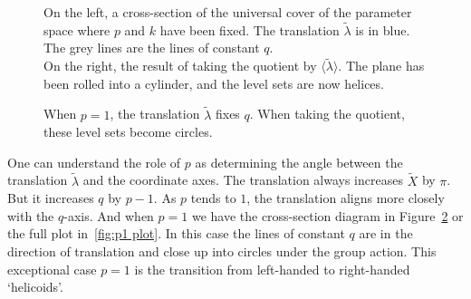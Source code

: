 \documentclass{article}
\begin{document}
\begin{figure}
\begin{tikzpicture}
        \end{tikzpicture}
    \caption{On the left, a cross-section of the universal cover of the parameter space where $p$ and $k$ have been fixed. The translation $\tilde{\lambda}$ is in blue. The grey lines are the lines of constant $q$.\\
    On the right, the result of taking the quotient by $\langle \tilde{\lambda}\rangle$. The plane has been rolled into a cylinder, and the level sets are now helices.\label{fig:level set quotient}}
\end{figure}
\begin{figure}
    
    \caption{When $p=1$, the translation $\tilde{\lambda}$ fixes $q$. When taking the quotient, these level sets become circles.\label{fig:level set quotient p1}}
\end{figure}

One can understand the role of $p$ as determining the angle between the translation $\tilde{\lambda}$ and the coordinate axes. The translation always increases $\tilde{X}$ by $\pi$. But it increases $q$ by $p-1$. As $p$ tends to $1$, the translation aligns more closely with the $q$-axis. And when $p=1$ we have the cross-section diagram in Figure~\ref{fig:level set quotient p1} or the full plot in~\ref{fig:p1 plot}. In this case the lines of constant $q$ are in the direction of translation and close up into circles under the group action. This exceptional case $p=1$ is the transition from left-handed to right-handed `helicoids'.
\end{document}
